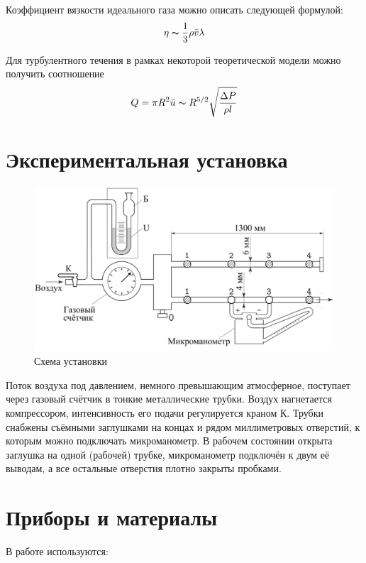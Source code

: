\documentclass[12pt]{article}
\begin{document}
Коэффициент вязкости идеального газа можно описать следующей формулой:
\begin{equation}
	\eta \thicksim \frac{1}{3}\rho \bar{v}\lambda
\end{equation}

Для турбулентного течения в рамках некоторой теоретической модели можно получить соотношение 
\begin{equation}
	Q= \pi R^2 \bar{u} \thicksim R^{5/2} \sqrt{\frac{\Delta P}{\rho l}}
\end{equation}

\section{Экспериментальная установка}

\begin{figure}[H]
	\centering
	\includegraphics[scale = 0.4]{./images/stand.png}
	\caption{Схема установки}
	\label{fig:stand}
\end{figure}

Поток воздуха
под давлением, немного превышающим атмосферное, поступает через газовый счётчик в тонкие металлические трубки. Воздух нагнетается компрессором, интенсивность его подачи регулируется краном К. Трубки снабжены съёмными заглушками на концах и рядом миллиметровых отверстий, к которым можно подключать микроманометр. В рабочем состоянии открыта заглушка на одной (рабочей) трубке, микроманометр подключён к двум её выводам, а все остальные отверстия плотно закрыты пробками.

\section{Приборы и материалы}

В работе используются:
\end{document}
